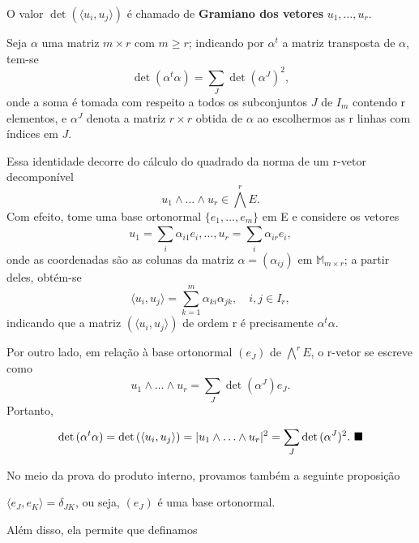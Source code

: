 \documentclass[../differential_forms.tex]{subfiles}
\begin{document}
\begin{tcolorbox}[
		skin=enhanced,
		title=Observação,
		fonttitle=\bfseries,
		colframe=black,
		colbacktitle=cyan!75!white,
		colback=cyan!15,
		colbacklower=black,
		coltitle=black,
		drop fuzzy shadow,
	]
	O valor \(\det{(\langle u_{i}, u_{j} \rangle)}\) é chamado de \textbf{Gramiano dos vetores} \(u_1, \dotsc , u_r\).
\end{tcolorbox}

\hypertarget{lagrange_identity}{
	\begin{prop*}
		Seja \(\alpha \) uma matriz \(m\times r\) com \(m\geq r\); indicando por \(\alpha^{t}\) a matriz transposta de \(\alpha \), tem-se
		\[
			\det{(\alpha^{t}\alpha )} = \sum\limits_{J}^{}\det{(\alpha^{J})^{2}},
		\]
		onde a soma é tomada com respeito a todos os subconjuntos \(J\) de \(I_{m}\) contendo r elementos, e \(\alpha^{J}\) denota a matriz \(r\times r\) obtida
		de \(\alpha \) ao escolhermos as r linhas com índices em \(J\).
	\end{prop*}
}
\begin{proof*}
	Essa identidade decorre do cálculo do quadrado da norma de um r-vetor  decomponível
	\[
		u_1\wedge \dotsc \wedge u_{r}\in \bigwedge^{r}E.
	\]
	Com efeito, tome uma base ortonormal \(\{e_1, \dotsc , e_{m}\}\) em E e considere os vetores
	\[
		u_1 = \sum\limits_{i}^{}\alpha_{i1}e_{i}, \dotsc , u_r = \sum\limits_{i}^{}\alpha_{ir}e_{i},
	\]
	onde as coordenadas são as colunas da matriz \(\alpha = (\alpha_{ij})\) em \(\mathbb{M}_{m\times r}\); a partir deles, obtém-se
	\[
		\langle u_{i}, u_{j} \rangle = \sum\limits_{k=1}^{m}\alpha_{ki}\alpha_{jk}, \quad i, j\in I_{r},
	\]
	indicando que a matriz \((\langle u_{i}, u_{j} \rangle)\) de ordem r é precisamente \(\alpha^{t}\alpha \).

	Por outro lado, em relação à base ortonormal \((e_{J})\) de \(\bigwedge^{r}E\), o r-vetor se escreve como
	\[
		u_1\wedge \dotsc \wedge u_r = \sum\limits_{J}^{}\det{(\alpha^{J})}e_{J}.
	\]
	Portanto,
	\[
		\det{(\alpha^{t}\alpha )} = \det{(\langle u_{i}, u_{j} \rangle)} = | u_1\wedge \dotsc \wedge u_r |^{2} = \sum\limits_{J}^{}\det{(\alpha^{J})^{2}}.\text{ $\blacksquare$}
	\]
\end{proof*}

No meio da prova do produto interno, provamos também a seguinte proposição
\begin{prop*}
	\(\langle e_{J}, e_{K} \rangle = \delta_{JK}\), ou seja, \((e_{J})\) é uma base ortonormal.
\end{prop*}
Além disso, ela permite que definamos
\end{document}

